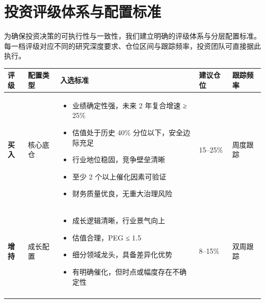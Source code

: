 
\section{投资评级体系与配置标准}

为确保投资决策的可执行性与一致性，我们建立明确的评级体系与分层配置标准。每一档评级对应不同的研究深度要求、仓位区间与跟踪频率，投资团队可直接据此执行。

\begin{exhibitbox}[表 10-1：投资评级体系与配置标准]
\centering
\small
\begin{tabularx}{\textwidth}{L{1.6cm} L{1.8cm} L{5.2cm} L{2.0cm} L{2.5cm}}
\toprule
\textbf{评级} & \textbf{配置类型} & \textbf{入选标准} & \textbf{建议仓位} & \textbf{跟踪频率} \\
\midrule
{}
\textbf{买入} & 核心底仓 & \vspace{-0.8em}\begin{itemize}[leftmargin=1.2em, topsep=0pt, partopsep=0pt]
  \item 业绩确定性强，未来 2 年复合增速 ≥ 25\%
  \item 估值处于历史 40\% 分位以下，安全边际充足
  \item 行业地位稳固，竞争壁垒清晰
  \item 至少 2 个以上催化因素可验证
  \item 财务质量优良，无重大治理风险
\end{itemize}\vspace{-0.8em} & 15–25\% & 周度跟踪 \\
\textbf{增持} & 成长配置 & \vspace{-0.8em}\begin{itemize}[leftmargin=1.2em, topsep=0pt, partopsep=0pt]
  \item 成长逻辑清晰，行业景气向上
  \item 估值合理，PEG ≤ 1.5
  \item 细分领域龙头，具备差异化优势
  \item 有明确催化，但时点或幅度存在不确定性
\end{itemize}\vspace{-0.8em} & 8–15\% & 双周跟踪 \\

\end{tabularx}
\end{exhibitbox}
